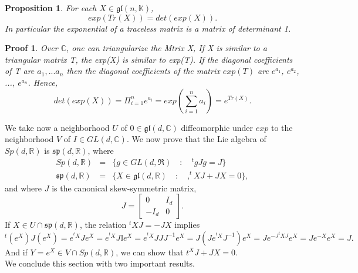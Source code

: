 \documentclass[a4paper,11pt]{article} %
\numberwithin{equation}{section} %
\numberwithin{figure}{section} %
\newtheorem{prop}{Proposition}
\newtheorem{demo}{Proof}
\begin{document}
\begin{prop} \cite[Propo. 2.6, p.53]{Yvette2005}
For each $X \in \mathfrak{gl}(n,\mathbb{K})$, 
\begin{equation}
exp(Tr(X)) = det(exp(X)). 
\end{equation}
In particular the exponential of a traceless matrix is a matrix of determinant 1. 
\end{prop}

\begin{demo}
Over $\mathbb{C}$, one can triangularize the Mtrix X, If X is similar to a triangular matrix T, the exp(X) is similar to exp(T). If the diagonal coefficients of T are $a_1, ... a_n$ then the diagonal coefficients of the matrix $exp(T)$ are $e^{a_1}$, $e^{a_2}$, ..., $e^{a_n}$. Hence,
\begin{equation}
det \left( exp(X) \right) = \Pi^{n}_{i=1} e^{a_i} = exp\left( \sum^{n}_{i=1} a_i \right) = e^{Tr(X)}. 
\end{equation}
\end{demo}

We take now a neighborhood  $U$ of  $0\in\mathfrak{gl}(d,\mathbb{C})$ diffeomorphic under $exp$ to the neighborhood $V$ of $I\in GL(d,\mathbb{C})$. We now prove that the Lie algebra of $Sp(d,\mathbb{R})$ is $\mathfrak{sp}(d,\mathbb{R})$, where 
\begin{eqnarray}
Sp(d,\mathbb{R}) &=& \{g\in GL(d,\mathfrak{R}) \quad:\quad ^{t}gJg=J \} \\
\mathfrak{sp}(d,\mathbb{R})&=& \{ X\in \mathfrak{gl}(d,\mathbb{R}) \quad:\quad,^{t}X J + JX = 0 \},
\end{eqnarray}
and where $J$ is the canonical skew-symmetric matrix,
\begin{equation}
 J= 
\left[
\begin{array}{ll}
0 & I_d \\
-I_d & 0
\end{array}
\right].
\end{equation}
If $X\in U\cap \mathfrak{sp}(d,\mathbb{R})$, the relation $^{t}XJ=-JX$ implies 
\begin{equation}
 ^{t}(e^X)J(e^X) = e^{^{t}X}Je^X = e^{^{t}X}J\mathbb{I}e^X = e^{^{t}X}JJJ^{-1}e^X = J(Je^{^{t}X}J^{-1})e^X = Je^{-J ^{t}XJ}e^X = Je^{-X}e^X = J. 
\end{equation}
And if $Y=e^X\in V\cap Sp(d,\mathbb{R})$, we can show that ${t}^XJ+JX=0$. \\

We conclude this section with two important results.
\end{document}
